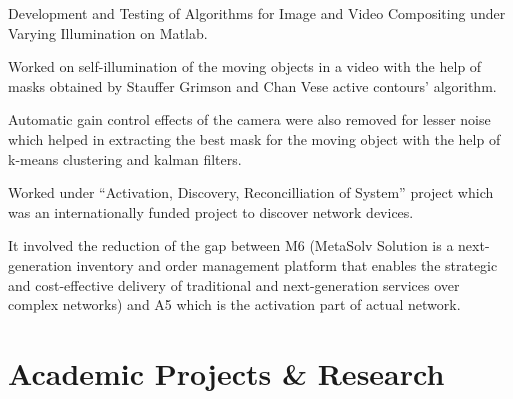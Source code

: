 \documentclass[letterpaper]{deedy-resume} %
\begin{document}
%
\begin{minipage}[t]{0.76\textwidth} %



\begin{tightitemize}
\item Development and Testing of Algorithms for Image and Video Compositing under Varying Illumination on Matlab.
\item Worked on self-illumination of the moving objects in a video with the help of masks obtained by Stauffer Grimson and Chan Vese active contours’ algorithm.
\item Automatic gain control effects of the camera were also removed for lesser noise which helped in extracting the best mask for the moving object with the help of k-means clustering and kalman filters.
\end{tightitemize}




\begin{tightitemize}
\item Worked under “Activation, Discovery, Reconcilliation of System” project which was an internationally funded project to discover network devices.
\item It involved the reduction of the gap between M6 (MetaSolv Solution is a next-generation inventory and order management platform that enables the strategic and cost-effective delivery of traditional and next-generation services over complex networks) and A5 which is the activation part of actual network.
\end{tightitemize}
\vspace{-5 mm}
\hfill

\section{Academic Projects \& Research}


\end{minipage}
\end{document}
